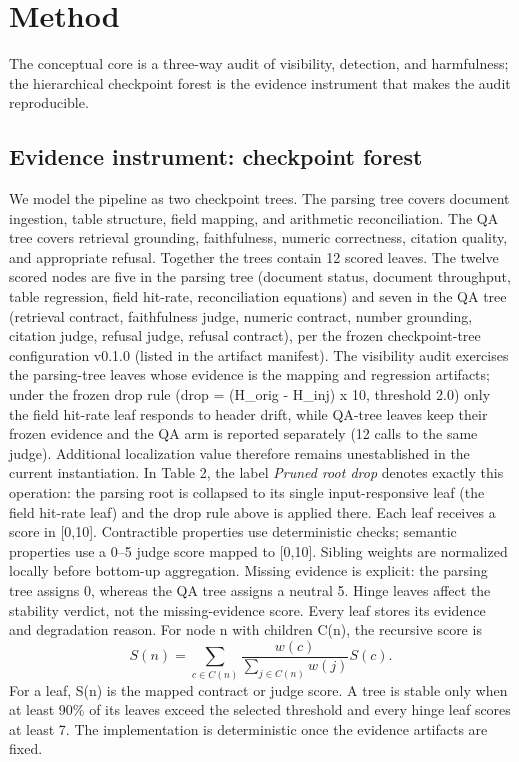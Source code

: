 \documentclass[10pt]{article}
\begin{document}
\section{Method}
The conceptual core is a three-way audit of visibility, detection, and harmfulness; the hierarchical checkpoint forest is the evidence instrument that makes the audit reproducible.
\subsection{Evidence instrument: checkpoint forest}
We model the pipeline as two checkpoint trees. The parsing tree covers document ingestion, table structure, field mapping, and arithmetic reconciliation. The QA tree covers retrieval grounding, faithfulness, numeric correctness, citation quality, and appropriate refusal. Together the trees contain 12 scored leaves.
The twelve scored nodes are five in the parsing tree (document status, document throughput, table regression, field hit-rate, reconciliation equations) and seven in the QA tree (retrieval contract, faithfulness judge, numeric contract, number grounding, citation judge, refusal judge, refusal contract), per the frozen checkpoint-tree configuration v0.1.0 (listed in the artifact manifest). The visibility audit exercises the parsing-tree leaves whose evidence is the mapping and regression artifacts; under the frozen drop rule (drop = (H\_orig - H\_inj) x 10, threshold 2.0) only the field hit-rate leaf responds to header drift, while QA-tree leaves keep their frozen evidence and the QA arm is reported separately (12 calls to the same judge). Additional localization value therefore remains unestablished in the current instantiation. In Table 2, the label \emph{Pruned root drop} denotes exactly this operation: the parsing root is collapsed to its single input-responsive leaf (the field hit-rate leaf) and the drop rule above is applied there.
Each leaf receives a score in [0,10]. Contractible properties use deterministic checks; semantic properties use a 0–5 judge score mapped to [0,10]. Sibling weights are normalized locally before bottom-up aggregation. Missing evidence is explicit: the parsing tree assigns 0, whereas the QA tree assigns a neutral 5. Hinge leaves affect the stability verdict, not the missing-evidence score. Every leaf stores its evidence and degradation reason.
For node n with children C(n), the recursive score is
\[
S(n)=\sum_{c\in C(n)} \frac{w(c)}{\sum_{j\in C(n)}w(j)}S(c).
\]
For a leaf, S(n) is the mapped contract or judge score. A tree is stable only when at least 90\% of its leaves exceed the selected threshold and every hinge leaf scores at least 7. The implementation is deterministic once the evidence artifacts are fixed.
\end{document}

